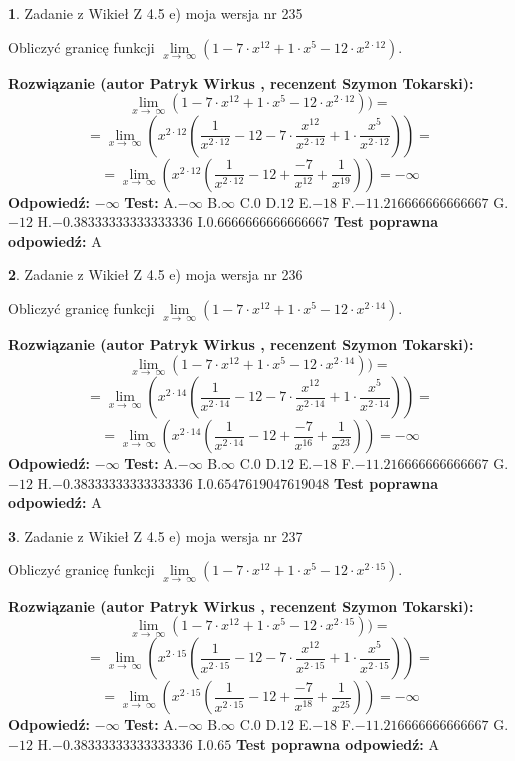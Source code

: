 \documentclass[12pt, a4paper]{article}
\theoremstyle{definition} %
\newtheorem{zad}{}
\newcommand{\zadStart}[1]{\begin{zad}#1\newline}
\newcommand{\zadStop}{\end{zad}}
\newcommand{\rozwStart}[2]{\noindent \textbf{Rozwiązanie (autor #1 , recenzent #2): }\newline}
\newcommand{\rozwStop}{\newline}
\newcommand{\odpStart}{\noindent \textbf{Odpowiedź:}\newline}
\newcommand{\odpStop}{\newline}
\newcommand{\testStart}{\noindent \textbf{Test:}\newline}
\newcommand{\testStop}{\newline}
\newcommand{\kluczStart}{\noindent \textbf{Test poprawna odpowiedź:}\newline}
\newcommand{\kluczStop}{\newline}
\begin{document}
\zadStart{Zadanie z Wikieł Z 4.5 e) moja wersja nr 235}


Obliczyć granicę funkcji  $\lim\limits_{x\to\ \infty}(1 - 7 \cdot x^{12}+1 \cdot x^{5}- 12 \cdot x^{2\cdot12})$.
\zadStop
\rozwStart{Patryk Wirkus}{Szymon Tokarski}
$$\lim\limits_{x\to\ \infty}(1 - 7 \cdot x^{12}+1 \cdot x^{5}- 12 \cdot x^{2\cdot12}))=$$
$$=\lim\limits_{x\to\ \infty}(x^{2\cdot12}(\frac{1}{x^{2\cdot12}}-12 -7 \cdot \frac{x^{12}}{x^{2\cdot12}}+1 \cdot \frac{x^{5}}{x^{2\cdot12}}))=$$
$$=\lim\limits_{x\to\ \infty}(x^{2\cdot12}(\frac{1}{x^{2\cdot12}}-12 + \frac{-7}{x^{12}}+ \frac{1}{x^{19}}))=-\infty$$
\rozwStop
\odpStart
$-\infty$
\odpStop
\testStart
A.$-\infty$ B.$\infty$ C.$0$ D.$12$ E.$-18$
F.$-11.216666666666667$ G.$-12$
H.$-0.38333333333333336$
I.$0.6666666666666667$
\testStop
\kluczStart
A
\kluczStop



\zadStart{Zadanie z Wikieł Z 4.5 e) moja wersja nr 236}


Obliczyć granicę funkcji  $\lim\limits_{x\to\ \infty}(1 - 7 \cdot x^{12}+1 \cdot x^{5}- 12 \cdot x^{2\cdot14})$.
\zadStop
\rozwStart{Patryk Wirkus}{Szymon Tokarski}
$$\lim\limits_{x\to\ \infty}(1 - 7 \cdot x^{12}+1 \cdot x^{5}- 12 \cdot x^{2\cdot14}))=$$
$$=\lim\limits_{x\to\ \infty}(x^{2\cdot14}(\frac{1}{x^{2\cdot14}}-12 -7 \cdot \frac{x^{12}}{x^{2\cdot14}}+1 \cdot \frac{x^{5}}{x^{2\cdot14}}))=$$
$$=\lim\limits_{x\to\ \infty}(x^{2\cdot14}(\frac{1}{x^{2\cdot14}}-12 + \frac{-7}{x^{16}}+ \frac{1}{x^{23}}))=-\infty$$
\rozwStop
\odpStart
$-\infty$
\odpStop
\testStart
A.$-\infty$ B.$\infty$ C.$0$ D.$12$ E.$-18$
F.$-11.216666666666667$ G.$-12$
H.$-0.38333333333333336$
I.$0.6547619047619048$
\testStop
\kluczStart
A
\kluczStop



\zadStart{Zadanie z Wikieł Z 4.5 e) moja wersja nr 237}


Obliczyć granicę funkcji  $\lim\limits_{x\to\ \infty}(1 - 7 \cdot x^{12}+1 \cdot x^{5}- 12 \cdot x^{2\cdot15})$.
\zadStop
\rozwStart{Patryk Wirkus}{Szymon Tokarski}
$$\lim\limits_{x\to\ \infty}(1 - 7 \cdot x^{12}+1 \cdot x^{5}- 12 \cdot x^{2\cdot15}))=$$
$$=\lim\limits_{x\to\ \infty}(x^{2\cdot15}(\frac{1}{x^{2\cdot15}}-12 -7 \cdot \frac{x^{12}}{x^{2\cdot15}}+1 \cdot \frac{x^{5}}{x^{2\cdot15}}))=$$
$$=\lim\limits_{x\to\ \infty}(x^{2\cdot15}(\frac{1}{x^{2\cdot15}}-12 + \frac{-7}{x^{18}}+ \frac{1}{x^{25}}))=-\infty$$
\rozwStop
\odpStart
$-\infty$
\odpStop
\testStart
A.$-\infty$ B.$\infty$ C.$0$ D.$12$ E.$-18$
F.$-11.216666666666667$ G.$-12$
H.$-0.38333333333333336$
I.$0.65$
\testStop
\kluczStart
A
\kluczStop
\end{document}
